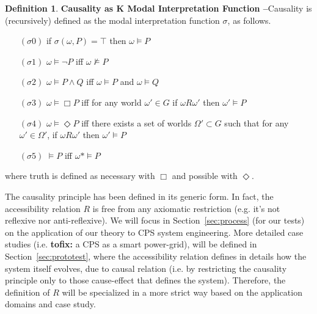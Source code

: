 \documentclass{article}
\newcommand{\fix}[2]{{\color{red} {\bf tofix:} #2}}
\theoremstyle{definition}
\newtheorem{definition}{Definition}[section]
\theoremstyle{corollary}
\theoremstyle{lemma}
\theoremstyle{theorem}
\theoremstyle{theorem}
\newcommand{\possibleworlds}{G}
\newcommand{\modalrelation}{R}
\newcommand{\actualworld}{\omega*}
\newcommand{\world}{\omega}
\newcommand{\World}{\Omega}
\newcommand{\interpretation}{\sigma}
\begin{document}
\begin{definition}{\bf Causality as K Modal Interpretation Function --}\label{def:modalinterpretation}
	Causality is (recursively) defined as the modal interpretation function $\interpretation$, as follows. 
	\begin{enumerate}[noitemsep]
		\item[$(\interpretation0)$] if $\interpretation(\world,P)=\top$ then $\world\models P$
		\item[$(\interpretation1)$] $\world\models\neg P$ iff $\world\not\models P$
		\item[$(\interpretation2)$] $\world\models P \wedge Q$ iff $\world\models P$ and $\world\models Q$
		\item[$(\interpretation3)$] $\world\models\Box P$ iff for any world $\world'\in\possibleworlds$ if $\world \modalrelation\world'$ then $\world'\models P$
		\item[$(\interpretation4)$] $\world\models\Diamond P$ iff there exists a set of worlds $\World'\subset\possibleworlds$ such that for any $\world'\in\World'$, if $\world\modalrelation\world'$ then $\world'\models P$
		\item[$(\interpretation5)$] $\models P$ iff $\actualworld\models P$
	\end{enumerate}
	where truth is defined as necessary with $\Box$ and possible with $\Diamond$.
\end{definition}


The causality principle has been defined in its
generic form. In fact, the accessibility relation $\modalrelation$ is free from
any axiomatic restriction (e.g. it's not reflexive nor anti-reflexive).  
We will focus in Section~\ref{sec:process} (for our tests) on 
the application of our theory to CPS system engineering.
More detailed case studies (i.e. \fix{mr}{a CPS as a smart power-grid}), 
will be defined in Section~\ref{sec:prototest}, where
the accessibility relation defines in details how the system itself evolves, due to causal relation 
(i.e. by restricting the causality principle only to those cause-effect that defines
the system). Therefore, the definition of $\modalrelation$
will be specialized in a more strict way based on the application domains and case study.
\end{document}
